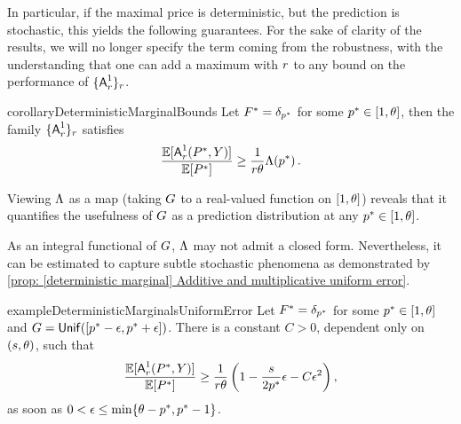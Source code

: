 In particular, if the maximal price is deterministic, but the prediction is stochastic, this yields the following guarantees. For the sake of clarity of the results, we will no longer specify the term coming from the robustness, with the understanding that one can add a maximum with $r$ to any bound on the performance of $\{\mbox{\textup{\textsf{A}}}^1_r\}_{r}$. 

\begin{restatable}{corollary}{DeterministicMarginalBounds}\label{lemma: [deterministic marginal] general bounds lemma}
    Let $F^*=\delta_{p^*}$ for some $p^*\in[1,\theta]$, then the family $\{\mbox{\textup{\textsf{A}}}^1_r\}_{r}$ satisfies
    \begin{align}
        \frac{\mathbb{E}[\mbox{\textup{\textsf{A}}}^1_r(P^*,Y)]}{\mathbb{E}[P^*]}\ge \frac{1}{r\theta} \Lambda(p^*)\,.\label{eq: [deterministic marginal] general bound for det price}
    \end{align}
\end{restatable}

Viewing $\Lambda$ as a map (taking $G$ to a real-valued function on $[1,\theta]$) reveals that it quantifies the usefulness of $G$ as a prediction distribution at any $p^*\in[1,\theta]$.

As an integral functional of $G$, $\Lambda$ may not admit a closed form. Nevertheless, it can be estimated to capture subtle stochastic phenomena as demonstrated by \cref{prop: [deterministic marginal] Additive and multiplicative uniform error}. 

\begin{restatable}{example}{DeterministicMarginalsUniformError}\label{prop: [deterministic marginal] Additive and multiplicative uniform error} Let $F^*=\delta_{p^*}$ for some $p^*\in[1,\theta]$ and $G=\mbox{\textup{\textsf{Unif}}}([p^*-\epsilon,p^*+\epsilon])$. There is a constant $C>0$, dependent only on $(s,\theta)$, such that
        \begin{align}
            \frac{\Eb[\algone(\Price,\Pred)]}{\Eb[\Price]}\ge  \frac{1}{\rob\ub} \left(1 -\frac{\smth}{2\price}\epsilon- C\epsilon^2\right)%
            \label{eq: [deterministic marginal] Additive uniform error PR bound},
        \end{align}
        as soon as $0<\epsilon\le \min\{\theta-p^*,p^*-1\}$.
\end{restatable}

